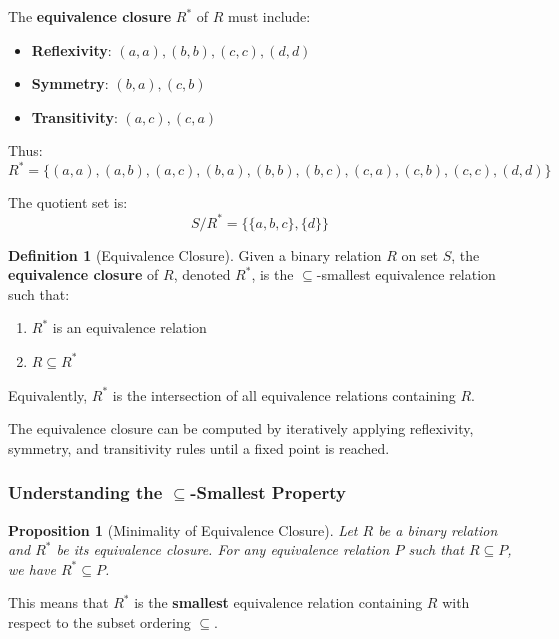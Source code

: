 \documentclass[11pt,a4paper]{article}
\theoremstyle{definition}
\newtheorem{definition}{Definition}[section]
\theoremstyle{plain}
\newtheorem{proposition}[theorem]{Proposition}
\theoremstyle{remark}
\begin{document}
The \textbf{equivalence closure} $R^*$ of $R$ must include:
\begin{itemize}
    \item \textbf{Reflexivity}: $(a, a), (b, b), (c, c), (d, d)$
    \item \textbf{Symmetry}: $(b, a), (c, b)$
    \item \textbf{Transitivity}: $(a, c), (c, a)$
\end{itemize}

Thus:
\[
R^* = \{(a, a), (a, b), (a, c), (b, a), (b, b), (b, c), (c, a), (c, b), (c, c), (d, d)\}
\]

The quotient set is:
\[
S/R^* = \{\{a, b, c\}, \{d\}\}
\]

\begin{tcolorbox}[colback=green!5!white,colframe=green!75!black,title=\textbf{Equivalence Closure}]
\begin{definition}[Equivalence Closure]
Given a binary relation $R$ on set $S$, the \textbf{equivalence closure} of $R$, denoted $R^*$, is the $\subseteq$-smallest equivalence relation such that:
\begin{enumerate}
    \item $R^*$ is an equivalence relation
    \item $R \subseteq R^*$
\end{enumerate}

Equivalently, $R^*$ is the intersection of all equivalence relations containing $R$.
\end{definition}
\end{tcolorbox}

The equivalence closure can be computed by iteratively applying reflexivity, symmetry, and transitivity rules until a fixed point is reached.

\subsubsection{Understanding the $\subseteq$-Smallest Property}

\begin{proposition}[Minimality of Equivalence Closure]
Let $R$ be a binary relation and $R^*$ be its equivalence closure. For any equivalence relation $P$ such that $R \subseteq P$, we have $R^* \subseteq P$.
\end{proposition}

This means that $R^*$ is the \textbf{smallest} equivalence relation containing $R$ with respect to the subset ordering $\subseteq$.
\end{document}
